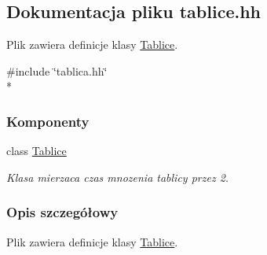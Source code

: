 \hypertarget{tablice_8hh}{\subsection{Dokumentacja pliku tablice.\-hh}
\label{tablice_8hh}
}


Plik zawiera definicje klasy \hyperlink{class_tablice}{Tablice}.  


{\ttfamily \#include \char`\"{}tablica.\-hh\char`\"{}}\\*
\subsubsection*{Komponenty}
\begin{DoxyCompactItemize}
\item 
class \hyperlink{class_tablice}{Tablice}
\begin{DoxyCompactList}\small\item\em Klasa mierzaca czas mnozenia tablicy przez 2. \end{DoxyCompactList}\end{DoxyCompactItemize}


\subsubsection{Opis szczegółowy}
Plik zawiera definicje klasy \hyperlink{class_tablice}{Tablice}. 
